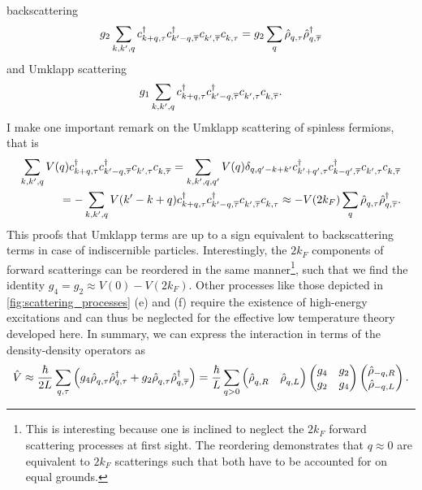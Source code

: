 backscattering
\begin{align}
    g_2\sum_{k,k',q}c^\dag_{k+q,\tau}c^\dag_{k'-q,\overline\tau}c^\pdag_{k',\overline\tau}c^\pdag_{k,\tau} = g_2\sum_q \hat\rho^\pdag_{q,\tau}\hat\rho^\dag_{q,\overline\tau}
\end{align}
and Umklapp scattering
\begin{align}
    g_1\sum_{k,k',q} c^\dag_{k+q,\tau}c^\dag_{k'-q,\overline\tau}c^\pdag_{k',\tau}c^\pdag_{k,\overline\tau}.
\end{align}
I make one important remark on the Umklapp scattering of spinless fermions, that is
\begin{align}
    \sum_{k,k',q}V(q)
    c^\dag_{k+q,\tau}c^\dag_{k'-q,\overline\tau}c^\pdag_{k',\tau}c^\pdag_{k,\overline\tau}
    =
    \sum_{k,k',q,q'}V(q) \delta_{q,q'-k+k'}
    c^\dag_{k'+q',\tau}c^\dag_{k-q',\overline\tau}c^\pdag_{k',\tau}c^\pdag_{k,\overline\tau}
    \\
    =
    -\sum_{k,k',q}V(k'-k+q)c^\dag_{k+q,\tau}c^\dag_{k'-q,\overline\tau}c^\pdag_{k',\overline\tau}c^\pdag_{k,\tau}
    \approx -V(2k_F)\sum_q\hat\rho^\pdag_{q,\tau}\hat\rho^\dag_{q,\overline\tau}.
\end{align}
This proofs that Umklapp terms are up to a sign equivalent to backscattering terms in case of indiscernible particles.
Interestingly, the $2k_F$ components of forward scatterings can be reordered in the same manner\footnote{This is interesting because one is inclined to neglect the $2k_F$ forward scattering processes at first sight. The reordering demonstrates that $q\approx0$ are equivalent to $2k_F$ scatterings such that both have to be accounted for on equal grounds.}, such that we find the identity $g_4 = g_2 \approx V(0)-V(2k_F)$.
Other processes like those depicted in \cref{fig:scattering_processes} (e) and (f) require the existence of high-energy excitations and can thus be neglected for the effective low temperature theory developed here.
In summary, we can express the interaction in terms of the density-density operators as
\begin{align}
    \hat V \approx \frac{\hbar}{2L}\sum_{q,\tau}\brlr{g_4\hat\rho^\pdag_{q,\tau}\hat\rho^\dag_{q,\tau} + g_2\hat\rho^\pdag_{q,\tau}\hat\rho^\dag_{q,\overline\tau}}
    =
    \frac{\hbar}{L}\sum_{q>0}
    \begin{pmatrix}
        \hat\rho^\pdag_{q,R} & \hat\rho^\pdag_{q,L}
    \end{pmatrix}
    \begin{pmatrix}
        g_4 & g_2 \\
        g_2 & g_4
    \end{pmatrix}
    \begin{pmatrix}
        \hat\rho_{-q,R} \\ \hat\rho_{-q,L}
    \end{pmatrix}
    .
    \label{eq:interaction_densities}
\end{align}
